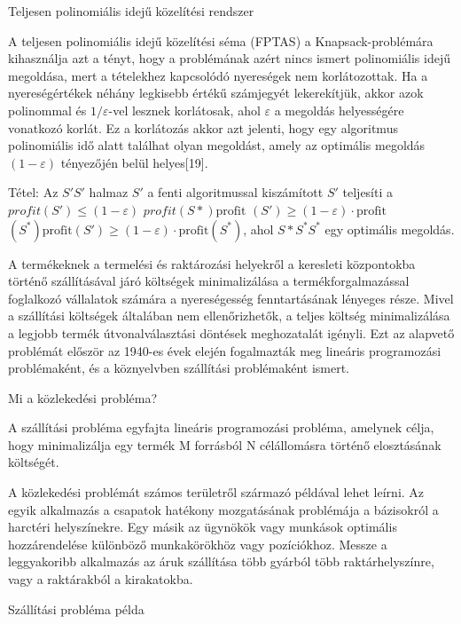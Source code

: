	Teljesen polinomiális idejű közelítési rendszer
	
	A teljesen polinomiális idejű közelítési séma (FPTAS) a Knapsack-problémára kihasználja azt a tényt, hogy a problémának azért nincs ismert polinomiális idejű megoldása, mert a tételekhez kapcsolódó nyereségek nem korlátozottak. Ha a nyereségértékek néhány legkisebb értékű számjegyét lekerekítjük, akkor azok polinommal és $1/\varepsilon$-vel lesznek korlátosak, ahol $\varepsilon$ a megoldás helyességére vonatkozó korlát. Ez a korlátozás akkor azt jelenti, hogy egy algoritmus polinomiális idő alatt találhat olyan megoldást, amely az optimális megoldás $(1-\varepsilon)$ tényezőjén belül helyes[19].
	
	Tétel: Az $S' {\displaystyle S'}$ halmaz 
	$S'$ 
	a fenti algoritmussal kiszámított 
	$S'$ 
	teljesíti a 
	$profit( S') \leq ( 1 - \varepsilon )$
	$profit(S*) {\displaystyle \mathrm {profit}}$
	$(S')\geq (1-\varepsilon )\cdot \mathrm {profit}$
	$(S^{*}) \mathrm {profit} (S')\geq (1-\varepsilon )\cdot \mathrm {profit} (S^{*})$, 
	ahol $S*{\displaystyle S^{*}} S^{*}$ egy optimális megoldás.
	
	
	A termékeknek a termelési és raktározási helyekről a keresleti központokba történő szállításával járó költségek minimalizálása a termékforgalmazással foglalkozó vállalatok számára a nyereségesség fenntartásának lényeges része. Mivel a szállítási költségek általában nem ellenőrizhetők, a teljes költség minimalizálása a legjobb termék útvonalválasztási döntések meghozatalát igényli. Ezt az alapvető problémát először az 1940-es évek elején fogalmazták meg lineáris programozási problémaként, és a köznyelvben szállítási problémaként ismert.
	
	
	Mi a közlekedési probléma?
	
	A szállítási probléma egyfajta lineáris programozási probléma, amelynek célja, hogy minimalizálja egy termék M forrásból N célállomásra történő elosztásának költségét.
	
	A közlekedési problémát számos területről származó példával lehet leírni. Az egyik alkalmazás a csapatok hatékony mozgatásának problémája a bázisokról a harctéri helyszínekre. Egy másik az ügynökök vagy munkások optimális hozzárendelése különböző munkakörökhöz vagy pozíciókhoz. Messze a leggyakoribb alkalmazás az áruk szállítása több gyárból több raktárhelyszínre, vagy a raktárakból a kirakatokba.
	
	Szállítási probléma példa
	

